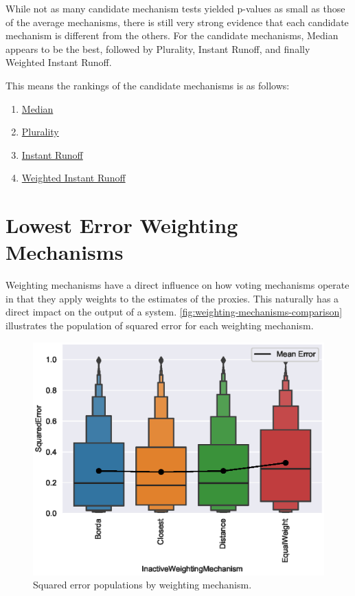 While not as many candidate mechanism tests yielded p-values as small as those of
the average mechanisms, there is still very strong evidence that each candidate
mechanism is different from the others.
For the candidate mechanisms, Median appears to be the best, followed
by Plurality, Instant Runoff, and finally Weighted Instant Runoff.
\begin{samepage}
    This means the rankings of the candidate mechanisms is as follows:
    \begin{enumerate}
        \item \hyperref[para:median]{Median}
        \item \hyperref[para:plurality]{Plurality}
        \item \hyperref[para:cand-instant-runoff]{Instant Runoff}
        \item \hyperref[para:cand-weighted-instant-runoff]{Weighted Instant Runoff}
    \end{enumerate}
\end{samepage}


\section{Lowest Error Weighting Mechanisms}\label{sec:lowest-error-weighting-mechanism}
Weighting mechanisms have a direct influence on how voting mechanisms operate in that
they apply weights to the estimates of the proxies.
This naturally has a direct impact on the output of a system.
\autoref{fig:weighting-mechanisms-comparison} illustrates the population of
squared error for each weighting mechanism.

\begin{figure}[htbp]
    \centering
    \includegraphics[scale=0.75]
    {./content/figures/weighting_mechanisms/weighting_mechanisms_comparison}
    \caption{Squared error populations by weighting mechanism.}
    \label{fig:weighting-mechanisms-comparison}
\end{figure}

